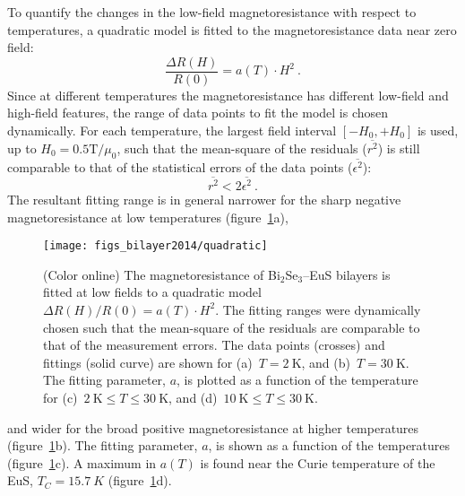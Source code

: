 To quantify the changes in the low-field magnetoresistance with respect to temperatures, a quadratic model is fitted to the magnetoresistance data near zero field:%
\begin{equation}\label{eq:bl2014_quadratic}%
    \frac{\Delta R(H)}{R(0)} = a(T)\cdot H^2~.%
\end{equation}%
Since at different temperatures the magnetoresistance has different low-field and high-field features, the range of data points to fit the model is chosen dynamically. For each temperature, the largest field interval $[-H_0, +H_0]$ is used, up to $H_0 = 0.5 \mathrm{T} / \mu_0$, such that the mean-square of the residuals ($\overline{r^2}$) is still comparable to that of the statistical errors of the data points ($\overline{\epsilon^2}$):
\begin{equation}
    \overline{r^2} < 2\overline{\epsilon^2}~.%
\end{equation}%
The resultant fitting range is in general narrower for the sharp negative magnetoresistance at low temperatures (figure~\ref{fig:bl2014_quadratic}a),%
%
\begin{figure}[ht]%
    \centering%
    \texttt{[image: figs\_bilayer2014/quadratic]}%
    \caption[Quadratic fittings to the magnetoresistance of Bi$_2$Se$_3$--EuS bilayers]{\label{fig:bl2014_quadratic}(Color online) The magnetoresistance of Bi$_2$Se$_3$--EuS bilayers is fitted at low fields to a quadratic model $\Delta R(H) / R(0) = a(T)\cdot H^2$. The fitting ranges were dynamically chosen such that the mean-square of the residuals are comparable to that of the measurement errors. The data points (crosses) and fittings (solid curve) are shown for (a)~$T=2~\mathrm{K}$, and (b)~$T=30~\mathrm{K}$. The fitting parameter, $a$, is plotted as a function of the temperature for (c)~$2~\mathrm{K} \leq T \leq 30~\mathrm{K}$, and (d)~$10~\mathrm{K} \leq T \leq 30~\mathrm{K}$.}%
\end{figure} %
%
and wider for the broad positive magnetoresistance at higher temperatures (figure~\ref{fig:bl2014_quadratic}b). The fitting parameter, $a$, is shown as a function of the temperatures (figure~\ref{fig:bl2014_quadratic}c). A maximum in $a(T)$ is found near the Curie temperature of the EuS, $T_C = \SI{15.7}{K}$ (figure~\ref{fig:bl2014_quadratic}d).

